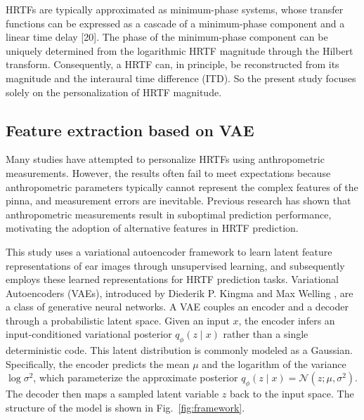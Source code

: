\documentclass[a4paper,fleqn]{cas-dc}
\begin{document}
HRTFs are typically approximated as minimum-phase systems, whose transfer functions can be expressed as a cascade of a minimum-phase component and a linear time delay [20]. The phase of the minimum-phase component can be uniquely determined from the logarithmic HRTF magnitude through the Hilbert transform. Consequently, a HRTF can, in principle, be reconstructed from its magnitude and the interaural time difference (ITD). So the present study focuses solely on the personalization of HRTF magnitude. 


\subsection{Feature extraction based on VAE}
Many studies have attempted to personalize HRTFs using anthropometric measurements. However, the results often fail to meet expectations because anthropometric parameters typically cannot represent the complex features of the pinna, and measurement errors are inevitable. Previous research \cite{zeng_hybrid_2010} has shown that anthropometric measurements result in suboptimal prediction performance, motivating the adoption of alternative features in HRTF prediction. 

This study uses a variational autoencoder framework to learn latent feature representations of ear images through unsupervised learning, and subsequently employs these learned representations for HRTF prediction tasks. Variational Autoencoders (VAEs), introduced by Diederik P. Kingma and Max Welling \cite{kingma_auto-encoding_2022}, are a class of generative neural networks. A VAE couples an encoder and a decoder through a probabilistic latent space. Given an input $x$, the encoder infers an input-conditioned variational posterior $ q_\phi(z\mid x)$ rather than a single deterministic code. This latent distribution is commonly modeled as a Gaussian. Specifically, the encoder predicts the mean $\mu$ and the logarithm of the variance $\log \sigma^2$, which parameterize the approximate posterior $q_{\phi}(z \mid x) = \mathcal{N}(z; \mu, \sigma^2)$.
The decoder then maps a sampled latent variable $z$ back to the input space. The structure of the model is shown in Fig.~\ref{fig:framework}.
\end{document}
